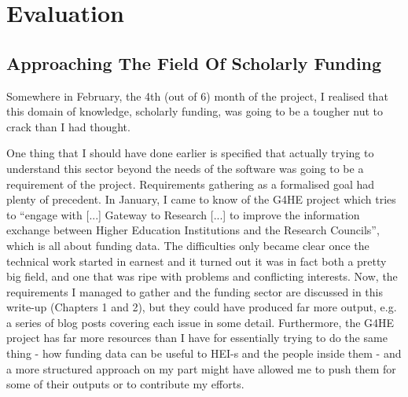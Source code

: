 \chapter{Evaluation}
\label{eval}




\section{Approaching The Field Of Scholarly Funding}
\label{eval-difficult-field}
Somewhere in February, the 4th (out of 6) month of the project, I realised that this domain of knowledge, scholarly funding, was going to be a tougher nut to crack than I had thought.

One thing that I should have done earlier is specified that actually trying to understand this sector beyond the needs of the software was going to be a requirement of the project. Requirements gathering as a formalised goal had plenty of precedent. In January, I came to know of the G4HE project which tries to ``engage with [...] Gateway to Research [...] to improve the information exchange between Higher Education Institutions and the Research Councils'', which is all about funding data. The difficulties only became clear once the technical work started in earnest and it turned out it was in fact both a pretty big field, and one that was ripe with problems and conflicting interests. Now, the requirements I managed to gather and the funding sector are discussed in this write-up (Chapters 1 and 2), but they could have produced far more output, e.g. a series of blog posts covering each issue in some detail. Furthermore, the G4HE project has far more resources than I have for essentially trying to do the same 
thing - how funding data can be useful to HEI-s and the people inside them - and a more structured approach on my part might have allowed me to push them for some of their outputs or to contribute my efforts.

